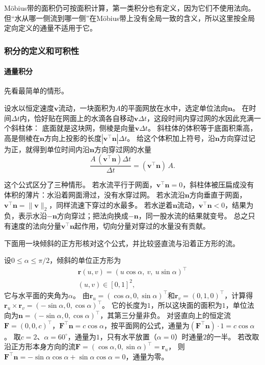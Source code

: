 Möbius带的面积仍可按面积计算，第一类积分也有定义，因为它们不使用法向。
但“水从哪一侧流到哪一侧”在Möbius带上没有全局一致的含义，所以这里按全局定向定义的通量不适用于它。

\subsubsection{积分的定义和可积性}

\paragraph{通量积分}

先看最简单的情形。

设水以恒定速度$\bm v$流动，一块面积为$A$的平面网放在水中，选定单位法向$\bm n$。
在时间$\Delta t$内，恰好贴在网面上的水滴各自移动$\bm v\Delta t$，这段时间内穿过网的水因此充满一个斜柱体：
底面就是这块网，侧棱是向量$\bm v\Delta t$。
斜柱体的体积等于底面积乘高，高是侧棱在$\bm n$方向上投影的长度$|\bm v^\top\bm n|\Delta t$。
给这个体积加上符号，沿$\bm n$方向穿过记为正，就得到单位时间内沿$\bm n$方向穿过网的水量
\[
 \frac{A\,(\bm v^\top\bm n)\Delta t}{\Delta t}=(\bm v^\top\bm n)\,A.
\]

这个公式区分了三种情形。
若水流平行于网面，$\bm v^\top\bm n=0$，斜柱体被压扁成没有体积的薄片：水沿着网面滑过，没有水穿过网。
若水流沿$\bm n$方向垂直于网面，$\bm v^\top\bm n=\lVert\bm v\rVert_2$，同样流速下穿过的水最多。
若水逆着$\bm n$流动，$\bm v^\top\bm n<0$，结果为负，表示水沿$-\bm n$方向穿过；把法向换成$-\bm n$，同一股水流的结果就变号。
总之只有速度的法向分量$\bm v^\top\bm n$起作用，切向分量对穿过的水量没有贡献。

下面用一块倾斜的正方形核对这个公式，并比较竖直流与沿着正方形的流。

\begin{example}[竖直流与切向流穿过倾斜正方形]
\label{ex:analysis-tilted-square-flux}
设$0\leq\alpha\leq\pi/2$，倾斜的单位正方形为
\[
\begin{gathered}
\bm r(u,v)=(u\cos\alpha,\ v,\ u\sin\alpha)^\top\\
(u,v)\in[0,1]^2,
\end{gathered}
\]
它与水平面的夹角为$\alpha$。
由$\bm r_u=(\cos\alpha,0,\sin\alpha)^\top$和$\bm r_v=(0,1,0)^\top$，计算得$\bm r_u\times\bm r_v=(-\sin\alpha,0,\cos\alpha)^\top$。
它的长度为$1$，所以这块面的面积为$1$，单位法向为$\bm n=(-\sin\alpha,0,\cos\alpha)^\top$，其第三分量非负。
对竖直向上的恒定流$\bm F=(0,0,c)^\top$，$\bm F^\top\bm n=c\cos\alpha$，按平面网的公式，通量为$(\bm F^\top\bm n)\cdot1=c\cos\alpha$。
取$c=2$、$\alpha=60^\circ$，通量为$1$，只有水平放置（$\alpha=0$）时通量$2$的一半。
若改取沿正方形本身方向的流$\bm F=(\cos\alpha,0,\sin\alpha)^\top=\bm r_u$，
则$\bm F^\top\bm n=-\sin\alpha\cos\alpha+\sin\alpha\cos\alpha=0$，通量为零。
\end{example}

